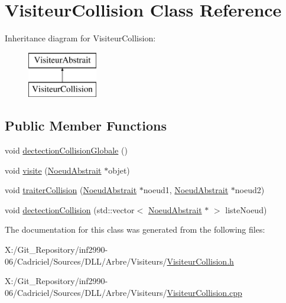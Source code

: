 \hypertarget{class_visiteur_collision}{\section{Visiteur\-Collision Class Reference}
\label{class_visiteur_collision}
}
Inheritance diagram for Visiteur\-Collision\-:\begin{figure}[H]
\begin{center}
\leavevmode
\includegraphics[height=2.000000cm]{class_visiteur_collision}
\end{center}
\end{figure}
\subsection*{Public Member Functions}
\begin{DoxyCompactItemize}
\item 
void \hyperlink{group__inf2990_ga29ee7ba632f5c95acac24243482c0232}{dectection\-Collision\-Globale} ()
\item 
void \hyperlink{group__inf2990_ga999f8c7d5c1f57332e615c44d8d95568}{visite} (\hyperlink{class_noeud_abstrait}{Noeud\-Abstrait} $\ast$objet)
\item 
void \hyperlink{group__inf2990_ga4c657ffb1bbba9dd0ddd356dfa8c849f}{traiter\-Collision} (\hyperlink{class_noeud_abstrait}{Noeud\-Abstrait} $\ast$noeud1, \hyperlink{class_noeud_abstrait}{Noeud\-Abstrait} $\ast$noeud2)
\item 
void \hyperlink{group__inf2990_ga029e144426fba67db28057e3a302ec57}{dectection\-Collision} (std\-::vector$<$ \hyperlink{class_noeud_abstrait}{Noeud\-Abstrait} $\ast$ $>$ liste\-Noeud)
\end{DoxyCompactItemize}


The documentation for this class was generated from the following files\-:\begin{DoxyCompactItemize}
\item 
X\-:/\-Git\-\_\-\-Repository/inf2990-\/06/\-Cadriciel/\-Sources/\-D\-L\-L/\-Arbre/\-Visiteurs/\hyperlink{_visiteur_collision_8h}{Visiteur\-Collision.\-h}\item 
X\-:/\-Git\-\_\-\-Repository/inf2990-\/06/\-Cadriciel/\-Sources/\-D\-L\-L/\-Arbre/\-Visiteurs/\hyperlink{_visiteur_collision_8cpp}{Visiteur\-Collision.\-cpp}\end{DoxyCompactItemize}
